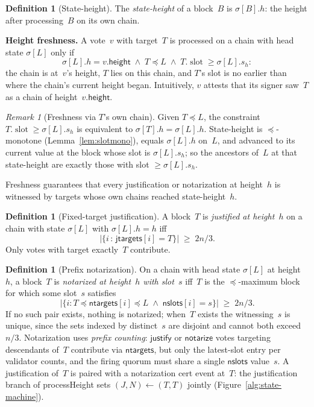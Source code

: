 \ifx\litemode\undefined\documentclass{article}\fi
\newcommand{\slot}[0]{\ensuremath{\operatorname{\mathrm{slot}}}}
\newcommand{\height}{\mathsf{height}}
\newcommand{\just}{\ensuremath{\mathsf{justify}}\xspace}
\newcommand{\notar}{\ensuremath{\mathsf{notarize}}\xspace}
\newcommand{\jtargets}{\mathsf{jtargets}}
\newcommand{\ntargets}{\mathsf{ntargets}}
\newcommand{\nslots}{\mathsf{nslots}}
\newcommand{\processHeight}{\textsf{processHeight}\xspace}
\renewcommand{\paragraph}[1]{\vspace{7pt}\noindent\textbf{#1}}
\theoremstyle{plain}
\theoremstyle{definition}
\newtheorem{definition}[theorem]{Definition}
\theoremstyle{remark}
\newtheorem{remark}[theorem]{Remark}
\begin{document}
\begin{definition}[State-height]\label{def:sheight}
The \emph{state-height} of a block~$B$ is $\sigma[B].h$: the height after processing~$B$ on its own chain.
\end{definition}

\paragraph{Height freshness.}
A vote~$v$ with target~$T$ is processed on a chain with head state $\sigma[L]$ only if
\[
  \sigma[L].h = v.\height \;\wedge\; T \preceq L \;\wedge\; T.\slot \geq \sigma[L].s_h:
\]
the chain is at~$v$'s height, $T$ lies on this chain, and $T$'s slot is no earlier than where the chain's current height began.
Intuitively, $v$ attests that its signer saw~$T$ as a chain of height~$v.\height$.

\begin{remark}[Freshness via $T$'s own chain]\label{rem:fresh-equiv}
Given $T \preceq L$, the constraint $T.\slot \geq \sigma[L].s_h$ is equivalent to $\sigma[T].h = \sigma[L].h$.
State-height is $\preceq$-monotone (Lemma~\ref{lem:slotmono}), equals $\sigma[L].h$ on~$L$, and advanced to its current value at the block whose slot is $\sigma[L].s_h$; so the ancestors of~$L$ at that state-height are exactly those with slot $\geq \sigma[L].s_h$.
\end{remark}

Freshness guarantees that every justification or notarization at height~$h$ is witnessed by targets whose own chains reached state-height~$h$.

\begin{definition}[Fixed-target justification]\label{def:justification}
A block~$T$ is \emph{justified at height~$h$} on a chain with state $\sigma[L]$ with $\sigma[L].h = h$ iff
\[
  \bigl|\{i \,:\, \jtargets[i] = T\}\bigr| \;\geq\; 2n/3.
\]
Only votes with target exactly~$T$ contribute.
\end{definition}

\begin{definition}[Prefix notarization]\label{def:notarization}
On a chain with head state $\sigma[L]$ at height~$h$, a block~$T$ is \emph{notarized at height~$h$ with slot~$s$} iff~$T$ is the $\preceq$-maximum block for which some slot~$s$ satisfies
\[
  \bigl|\{i : T \preceq \ntargets[i] \preceq L \;\wedge\; \nslots[i] = s\}\bigr| \;\geq\; 2n/3.
\]
If no such pair exists, nothing is notarized; when~$T$ exists the witnessing~$s$ is unique, since the sets indexed by distinct~$s$ are disjoint and cannot both exceed~$n/3$.
Notarization uses \emph{prefix counting}: \just or \notar votes targeting descendants of~$T$ contribute via $\ntargets$, but only the latest-slot entry per validator counts, and the firing quorum must share a single $\nslots$ value~$s$.
A justification of~$T$ is paired with a notarization cert event at~$T$: the justification branch of \processHeight sets $(J, N) \gets (T, T)$ jointly (Figure~\ref{alg:state-machine}).
\end{definition}
\end{document}
